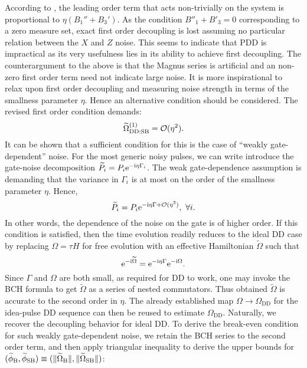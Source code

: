 \documentclass[pra,reprint,superscriptaddress]{revtex4-2}
\newcommand{\wtP}{\widetilde{P}}
\newcommand{\wtO}{\widetilde{\Omega}}
\newcommand{\wt}[1]{\widetilde{#1}}
\newcommand{\rDD}{\mathrm{DD}}
\begin{document}
According to , the leading order term that acts non-trivially on the system is proportional to $\eta(B_1''+B_3')$. 
As the condition $B''_1+B'_3=0$ corresponding to a zero measure set, exact first order decoupling is lost assuming no particular relation between the $X$ and $Z$ noise. 
This seems to indicate that PDD is impractical as its very usefulness lies in its ability to achieve first decoupling. 
The counterargument to the above is that the Magnus series is artificial and an non-zero 
first order term need not indicate large noise. It is more inspirational to relax upon first order decoupling and measuring noise strength in terms of the smallness parameter $\eta$.  Hence an alternative condition should be 
considered. The revised first order condition demands:
\begin{equation}
 \wt\Omega_{\rDD:\rSB}\up{1} = \cO(\eta^2).
\end{equation}
It can be shown that a sufficient condition for this is the case of ``weakly gate-dependent'' noise.
For the most generic noisy pulses, we can write introduce the gate-noise decomposition $\wtP_i = P_i \upe^{-\upi \eta \Gamma_i}$. The weak gate-dependence assumption is demanding that the variance in $\Gamma_i$  
is at most on the order of the smallness parameter $\eta$. Hence, 
\begin{equation}\label{eq:gateindep1}
 \wtP_i = P_i \upe^{-\upi \eta \Gamma + \cO(\eta^2)},\ \forall i.
\end{equation}
In other words, the dependence of the noise on the gate is of higher order. If this condition is 
 satisfied, then the time evolution readily reduces to the ideal DD case by replacing $\Omega=\tau H$ for free evolution with an effective Hamiltonian $\wtO$ such that
\begin{equation}
\upe^{-\upi \wtO}=\upe^{-\upi \eta \Gamma}\upe^{-\upi \Omega}.
\end{equation}
Since $\Gamma$ and $\Omega$ are both small, as required for DD to work,
one may invoke the BCH formula to get $\wtO$ as a series of nested commutators. 
Thus obtained $\wt \Omega$ is accurate to the second order in $\eta$.
The already established map $\Omega\to \Omega_{\rDD}$ for the idea-pulse DD sequence can then be reused to estimate $\Omega_{\rDD}$.
Naturally, we recover the decoupling behavior for ideal DD. To derive the break-even condition for such weakly gate-dependent noise, 
we retain the BCH series to the second order term, and then apply triangular inequality to derive the upper bounds for $(\widetilde\phi_\rB,\widetilde{\phi}_\rSB) \equiv( \norm{\wtO_\rB}, \norm{\wtO_\rSB})$:
\end{document}
